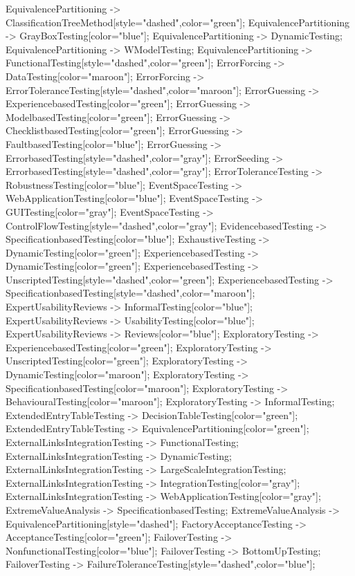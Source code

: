 \documentclass{article}
\begin{document}
{EquivalencePartitioning -> ClassificationTreeMethod[style="dashed",color="green"];
EquivalencePartitioning -> GrayBoxTesting[color="blue"];
EquivalencePartitioning -> DynamicTesting;
EquivalencePartitioning -> WModelTesting;
EquivalencePartitioning -> FunctionalTesting[style="dashed",color="green"];
ErrorForcing -> DataTesting[color="maroon"];
ErrorForcing -> ErrorToleranceTesting[style="dashed",color="maroon"];
ErrorGuessing -> ExperiencebasedTesting[color="green"];
ErrorGuessing -> ModelbasedTesting[color="green"];
ErrorGuessing -> ChecklistbasedTesting[color="green"];
ErrorGuessing -> FaultbasedTesting[color="blue"];
ErrorGuessing -> ErrorbasedTesting[style="dashed",color="gray"];
ErrorSeeding -> ErrorbasedTesting[style="dashed",color="gray"];
ErrorToleranceTesting -> RobustnessTesting[color="blue"];
EventSpaceTesting -> WebApplicationTesting[color="blue"];
EventSpaceTesting -> GUITesting[color="gray"];
EventSpaceTesting -> ControlFlowTesting[style="dashed",color="gray"];
EvidencebasedTesting -> SpecificationbasedTesting[color="blue"];
ExhaustiveTesting -> DynamicTesting[color="green"];
ExperiencebasedTesting -> DynamicTesting[color="green"];
ExperiencebasedTesting -> UnscriptedTesting[style="dashed",color="green"];
ExperiencebasedTesting -> SpecificationbasedTesting[style="dashed",color="maroon"];
ExpertUsabilityReviews -> InformalTesting[color="blue"];
ExpertUsabilityReviews -> UsabilityTesting[color="blue"];
ExpertUsabilityReviews -> Reviews[color="blue"];
ExploratoryTesting -> ExperiencebasedTesting[color="green"];
ExploratoryTesting -> UnscriptedTesting[color="green"];
ExploratoryTesting -> DynamicTesting[color="maroon"];
ExploratoryTesting -> SpecificationbasedTesting[color="maroon"];
ExploratoryTesting -> BehaviouralTesting[color="maroon"];
ExploratoryTesting -> InformalTesting;
ExtendedEntryTableTesting -> DecisionTableTesting[color="green"];
ExtendedEntryTableTesting -> EquivalencePartitioning[color="green"];
ExternalLinksIntegrationTesting -> FunctionalTesting;
ExternalLinksIntegrationTesting -> DynamicTesting;
ExternalLinksIntegrationTesting -> LargeScaleIntegrationTesting;
ExternalLinksIntegrationTesting -> IntegrationTesting[color="gray"];
ExternalLinksIntegrationTesting -> WebApplicationTesting[color="gray"];
ExtremeValueAnalysis -> SpecificationbasedTesting;
ExtremeValueAnalysis -> EquivalencePartitioning[style="dashed"];
FactoryAcceptanceTesting -> AcceptanceTesting[color="green"];
FailoverTesting -> NonfunctionalTesting[color="blue"];
FailoverTesting -> BottomUpTesting;
FailoverTesting -> FailureToleranceTesting[style="dashed",color="blue"];
}
\end{document}
